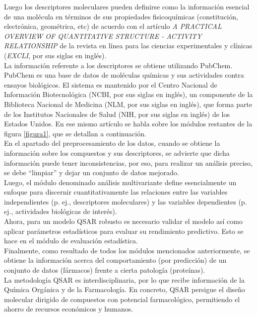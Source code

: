 \noindent Luego los descriptores moleculares pueden definirse como la información esencial de una molécula en términos de sus propiedades fisicoquímicas (constitución, electrónica, geométrica, etc) de acuerdo con el artículo\textit{ A PRACTICAL OVERVIEW OF QUANTITATIVE STRUCTURE - ACTIVITY RELATIONSHIP} de la revista en línea para las ciencias experimentales y clínicas (\textit{EXCLI}, por sus siglas en inglés)\cite{9}.\\

\noindent La información referente a los descriptores se obtiene utilizando PubChem. PubChem es una base de datos de moléculas químicas y sus actividades contra ensayos biológicos. El sistema es mantenido por el Centro Nacional de Información Biotecnológica (NCBI, por sus siglas en inglés), un componente de la Biblioteca Nacional de Medicina (NLM, por sus siglas en inglés), que forma parte de los Institutos Nacionales de Salud (NIH, por sus siglas en inglés) de los Estados Unidos.
En ese mismo artículo se habla sobre los módulos restantes de la figura \ref{figura1}, que se detallan a continuación.\\

\noindent En el apartado del preprocesamiento de los datos, cuando se obtiene la información sobre los compuestos y sus descriptores, se advierte que dicha información puede tener inconsistencias, por eso, para realizar un análisis preciso, se debe “limpiar” y dejar un conjunto de datos mejorado.\\

\noindent Luego, el módulo denominado análisis multivariante define esencialmente un enfoque para discernir cuantitativamente las relaciones entre las variables independientes (p. ej., descriptores moleculares) y las variables dependientes (p. ej., actividades biológicas de interés).\\

\noindent Ahora, para un modelo QSAR robusto es necesario validar el modelo así como aplicar parámetros estadísticos para evaluar su rendimiento predictivo. Esto se hace en el módulo de evaluación estadística.\\

\noindent Finalmente, como resultado de todos los módulos mencionados anteriormente, se obtiene la información acerca del comportamiento (por predicción) de un conjunto de datos (fármacos) frente a cierta patología (proteínas).\\

\noindent La metodología QSAR es interdisciplinaria, por lo que recibe información de la Química Orgánica y de la Farmacología. En concreto, QSAR persigue el diseño molecular dirigido de compuestos con potencial farmacológico, permitiendo el ahorro de recursos económicos y humanos.\\

